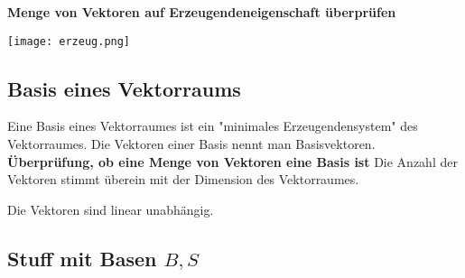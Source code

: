 \begin{multicols*}{3}
    {\textbf{Menge von Vektoren auf Erzeugendeneigenschaft überprüfen}}

    {\texttt{[image: erzeug.png]}}



    \subsection{Basis eines Vektorraums}
    {Eine Basis eines Vektorraumes ist ein "minimales Erzeugendensystem" des Vektorraumes. Die Vektoren einer Basis nennt man Basisvektoren.}
    {\textbf{Überprüfung, ob eine Menge von Vektoren eine Basis ist}}
    { Die Anzahl der Vektoren stimmt überein mit der Dimension des Vektorraumes.}

    { Die Vektoren sind linear unabhängig.}

    \subsection{Stuff mit Basen $B,S$}

\end{multicols*}


